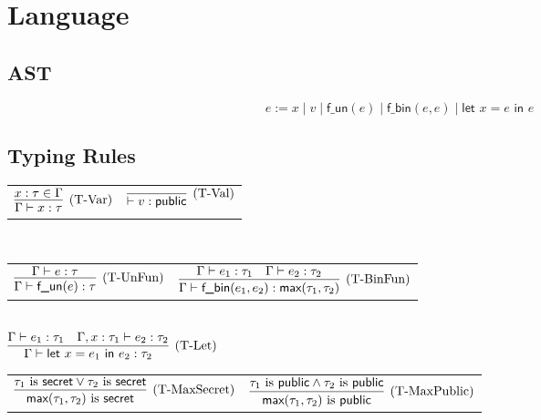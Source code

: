 \documentclass{article}
\begin{document}
\section{Language}
\subsection{AST}

\[ e := x \mid v \mid \textsf{f\_un}(e) \mid \textsf{f\_bin}(e, e) \mid \textsf{let } x = e \textsf{ in } e \]


\subsection{Typing Rules}

\centering
\begin{tabular}{cc}
$\infer[(\text{T-Var})]{
    \Gamma \vdash x : \tau
}{
    x : \tau \in \Gamma
}$ &

$\infer[(\text{T-Val})]{
    \vdash v : \textsf{public}
}{}$
\end{tabular} \\

\vspace{0.5cm}
\centering
\begin{tabular}{cc}
$\infer[(\text{T-UnFun})]{ \Gamma \vdash \textsf{f\_un}(e) : \tau }{ \Gamma \vdash e : \tau }$ &

$\infer[(\text{T-BinFun})]{ 
    \Gamma \vdash \textsf{f\_bin}(e_1, e_2) : \textsf{max}(\tau_1, \tau_2) 
}{
    \Gamma \vdash e_1 : \tau_1
    & \Gamma \vdash e_2 : \tau_2
}$
\end{tabular} \\

\vspace{0.5cm}
\centering
$\infer[(\text{T-Let})]{
    \Gamma \vdash \textsf{let } x = e_1 \textsf{ in } e_2 : \tau_2
}{
    \Gamma \vdash e_1 : \tau_1
    & \Gamma, x : \tau_1 \vdash e_2 : \tau_2
}$

\vspace{0.5cm}
\centering
\begin{tabular}{cc}
$\infer[(\text{T-MaxSecret})]{ \textsf{max}(\tau_1, \tau_2) \text{ is } \textsf{secret} }{ \tau_1 \text{ is } \textsf{secret} \lor \tau_2 \text{ is } \textsf{secret} }$ &

$\infer[(\text{T-MaxPublic})]{ \textsf{max}(\tau_1, \tau_2) \text{ is } \textsf{public} }{ \tau_1 \text{ is } \textsf{public} \land \tau_2 \text{ is } \textsf{public} }$
\end{tabular}
\end{document}
